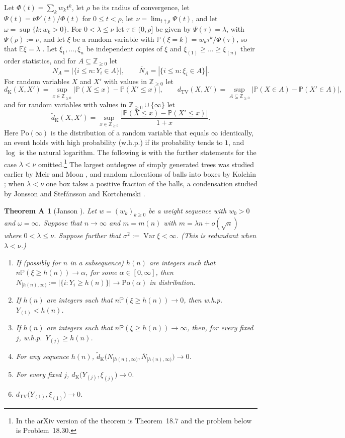 \documentclass[11pt]{amsart}
\newtheorem*{theoremA}{Theorem A}
\numberwithin{equation}{section}
\newcommand{\Pp}{\mathbb P}
\newcommand{\E}{\mathbb E}
\newcommand{\Z}{\mathbb Z}
\newcommand{\Nb}{\overline N}
\newcommand{\dK}{d_{\mathrm K}}
\newcommand{\tdK}{\widetilde d_{\mathrm K}}
\newcommand{\dTV}{d_{\mathrm{TV}}}
\newcommand{\Po}{\mathrm{Po}}
\DeclareMathOperator{\Var}{Var}
\begin{document}
Let $\Phi(t)=\sum_kw_kt^k$, let $\rho$ be its radius of convergence, let $\Psi(t)=t\Phi'(t)/\Phi(t)$ for $0\le t<\rho$, let $\nu=\lim_{t\uparrow\rho}\Psi(t)$, and let $\omega=\sup\{k:w_k>0\}$. For $0<\lambda\le\nu$ let $\tau\in(0,\rho]$ be given by $\Psi(\tau)=\lambda$, with $\Psi(\rho):=\nu$, and let $\xi$ be a random variable with $\Pp(\xi=k)=w_k\tau^k/\Phi(\tau)$, so that $\E\xi=\lambda$ \cite[Sections~3 and~11]{J12}. Let $\xi_1,\dots,\xi_n$ be independent copies of $\xi$ and $\xi_{(1)}\ge\dots\ge\xi_{(n)}$ their order statistics, and for $A\subseteq\Z_{\ge0}$ let
\[
N_A=|\{i\le n:Y_i\in A\}|,\qquad \Nb_A=|\{i\le n:\xi_i\in A\}|.
\]
For random variables $X$ and $X'$ with values in $\Z_{\ge0}$ let
\[
\dK(X,X')=\sup_{x\in\Z_{\ge0}}|\Pp(X\le x)-\Pp(X'\le x)|,\qquad \dTV(X,X')=\sup_{A\subseteq\Z_{\ge0}}|\Pp(X\in A)-\Pp(X'\in A)|,
\]
and for random variables with values in $\Z_{\ge0}\cup\{\infty\}$ let
\[
\tdK(X,X')=\sup_{x\in\Z_{\ge0}}\frac{|\Pp(X\le x)-\Pp(X'\le x)|}{1+x}.
\]
Here $\Po(\infty)$ is the distribution of a random variable that equals $\infty$ identically, an event holds with high probability (w.h.p.) if its probability tends to $1$, and $\log$ is the natural logarithm. The following is \cite[Theorem~19.7]{J12} with the further statements for the case $\lambda<\nu$ omitted.\footnote{In the arXiv version of \cite{J12} the theorem is Theorem~18.7 and the problem below is Problem~18.30.} The largest outdegree of simply generated trees was studied earlier by Meir and Moon \cite{MM90}, and random allocations of balls into boxes by Kolchin \cite{Kol86}; when $\lambda<\nu$ one box takes a positive fraction of the balls, a condensation studied by Jonsson and Stef\'ansson \cite{JS11} and Kortchemski \cite{Kor15}.

\begin{theoremA}[{Janson \cite[Theorem~19.7]{J12}}]
Let $w=(w_k)_{k\ge0}$ be a weight sequence with $w_0>0$ and $\omega=\infty$. Suppose that $n\to\infty$ and $m=m(n)$ with $m=\lambda n+o(\sqrt n)$ where $0<\lambda\le\nu$. Suppose further that $\sigma^2:=\Var\xi<\infty$. \textup{(}This is redundant when $\lambda<\nu$.\textup{)}
\begin{enumerate}[label=\textup{(\roman*)}]
\item If \textup{(}possibly for $n$ in a subsequence\textup{)} $h(n)$ are integers such that $n\Pp(\xi\ge h(n))\to\alpha$, for some $\alpha\in[0,\infty]$, then $N_{[h(n),\infty)}:=|\{i:Y_i\ge h(n)\}|\to\Po(\alpha)$ in distribution.
\item If $h(n)$ are integers such that $n\Pp(\xi\ge h(n))\to0$, then w.h.p.\ $Y_{(1)}<h(n)$.
\item If $h(n)$ are integers such that $n\Pp(\xi\ge h(n))\to\infty$, then, for every fixed $j$, w.h.p.\ $Y_{(j)}\ge h(n)$.
\item For any sequence $h(n)$, $\tdK\bigl(N_{[h(n),\infty)},\Nb_{[h(n),\infty)}\bigr)\to0$.
\item For every fixed $j$, $\dK\bigl(Y_{(j)},\xi_{(j)}\bigr)\to0$.
\item $\dTV\bigl(Y_{(1)},\xi_{(1)}\bigr)\to0$.
\end{enumerate}
\end{theoremA}
\end{document}
